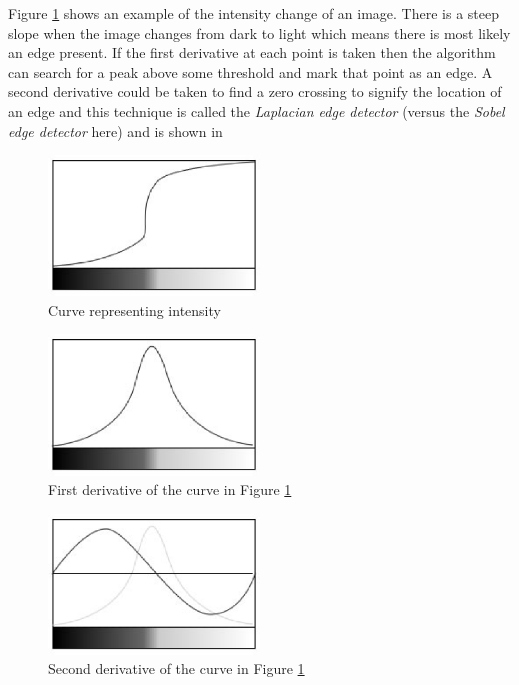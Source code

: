 \cite{AIShackSobelLaplacian}

Figure \ref{fig:sobel_sample_edge} shows an example of the intensity change of an image. There is a steep slope when the image changes from dark to light which means there is most likely an edge present. If the first derivative at each point is taken then the algorithm can search for a peak above some threshold and mark that point as an edge. A second derivative could be taken to find a zero crossing to signify the location of an edge and this technique is called the \emph{Laplacian edge detector} (versus the \emph{Sobel edge detector} here) and is shown in 

\begin{figure}[ht!]
{
\centering
\includegraphics[width=0.5\textwidth]{eps_pics/sample-edge}
\caption{Curve representing intensity}
\label{fig:sobel_sample_edge}
}
\end{figure}

\begin{figure}[ht!]
{
\centering
\includegraphics[width=0.5\textwidth]{eps_pics/sample-edge-first-derivative}
\caption{First derivative of the curve in Figure \ref{fig:sobel_sample_edge}}
\label{fig:sobel_sample_edge_first_deriv}
}
\end{figure}

\begin{figure}[ht!]
{
\centering
\includegraphics[width=0.5\textwidth]{eps_pics/sample-edge-second-derivative}
\caption{Second derivative of the curve in Figure \ref{fig:sobel_sample_edge}}
\label{fig:sobel_sample_edge_second_deriv}
}
\end{figure}


